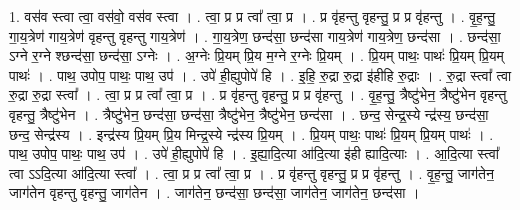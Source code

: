 \documentclass[17pt]{extarticle}
\begin{document}
1. वस॑व स्त्वा त्वा॒ वस॑वो॒ वस॑व स्त्वा । . त्वा॒ प्र प्र त्वा᳚ त्वा॒ प्र । . प्र वृ॑हन्तु वृहन्तु॒ प्र प्र वृ॑हन्तु । . वृ॒ह॒न्तु॒ गा॒य॒त्रेण॑ गाय॒त्रेण॑ वृहन्तु वृहन्तु गाय॒त्रेण॑ । . गा॒य॒त्रेण॒ छन्द॑सा॒ छन्द॑सा गाय॒त्रेण॑ गाय॒त्रेण॒ छन्द॑सा । . छन्द॑सा॒ ऽग्ने र॒ग्ने श्छन्द॑सा॒ छन्द॑सा॒ ऽग्नेः । . अ॒ग्नेः प्रि॒यम् प्रि॒य म॒ग्ने र॒ग्नेः प्रि॒यम् । . प्रि॒यम् पाथः॒ पाथः॑ प्रि॒यम् प्रि॒यम् पाथः॑ । . पाथ॒ उपोप॒ पाथः॒ पाथ॒ उप॑ । . उपे॑ ही॒ह्युपोपे॑ हि । . इ॒हि॒ रु॒द्रा रु॒द्रा इ॑हीहि रु॒द्राः । . रु॒द्रा स्त्वा᳚ त्वा रु॒द्रा रु॒द्रा स्त्वा᳚ । . त्वा॒ प्र प्र त्वा᳚ त्वा॒ प्र । . प्र वृ॑हन्तु वृहन्तु॒ प्र प्र वृ॑हन्तु । . वृ॒ह॒न्तु॒ त्रैष्टु॑भेन॒ त्रैष्टु॑भेन वृहन्तु वृहन्तु॒ त्रैष्टु॑भेन । . त्रैष्टु॑भेन॒ छन्द॑सा॒ छन्द॑सा॒ त्रैष्टु॑भेन॒ त्रैष्टु॑भेन॒ छन्द॑सा । . छन्द॒ सेन्द्र॒स्ये न्द्र॑स्य॒ छन्द॑सा॒ छन्द॒ सेन्द्र॑स्य । . इन्द्र॑स्य प्रि॒यम् प्रि॒य मिन्द्र॒स्ये न्द्र॑स्य प्रि॒यम् । . प्रि॒यम् पाथः॒ पाथः॑ प्रि॒यम् प्रि॒यम् पाथः॑ । . पाथ॒ उपोप॒ पाथः॒ पाथ॒ उप॑ । . उपे॑ ही॒ह्युपोपे॑ हि । . इ॒ह्या॒दि॒त्या आ॑दि॒त्या इ॑ही ह्यादि॒त्याः । . आ॒दि॒त्या स्त्वा᳚ त्वा ऽऽदि॒त्या आ॑दि॒त्या स्त्वा᳚ । . त्वा॒ प्र प्र त्वा᳚ त्वा॒ प्र । . प्र वृ॑हन्तु वृहन्तु॒ प्र प्र वृ॑हन्तु । . वृ॒ह॒न्तु॒ जाग॑तेन॒ जाग॑तेन वृहन्तु वृहन्तु॒ जाग॑तेन । . जाग॑तेन॒ छन्द॑सा॒ छन्द॑सा॒ जाग॑तेन॒ जाग॑तेन॒ छन्द॑सा । \newline
\end{document}
